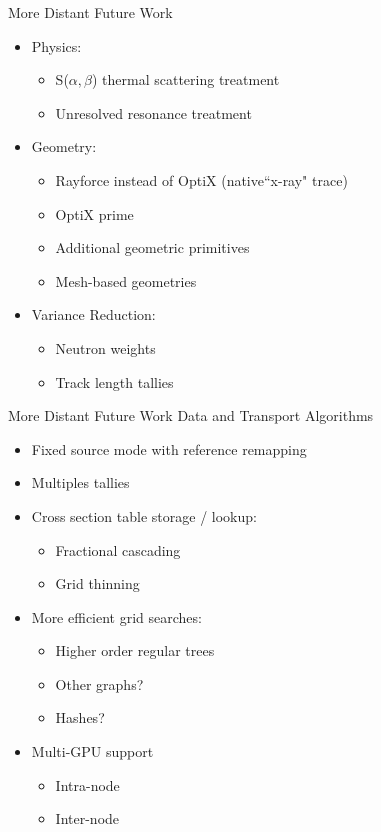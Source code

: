 \documentclass[xcolor=x11names, compress]{beamer}
\renewcommand{\(}{\begin{columns}}
\renewcommand{\)}{\end{columns}}
\newcommand{\<}[1]{\begin{column}{#1}}
\renewcommand{\>}{\end{column}}
\begin{document}
\begin{frame}{More Distant Future Work}
	\begin{itemize}
	\item Physics:
	    \begin{itemize}
	    \item S($\alpha, \beta$) thermal scattering treatment
	    \item Unresolved resonance treatment
	    \end{itemize}
	    \pause
	\vspace*{1 em}
	\item Geometry:
		\begin{itemize}
	    \item Rayforce instead of OptiX (native``x-ray" trace)
	    \item OptiX prime
	    \item Additional geometric primitives
		\item Mesh-based geometries
	    \end{itemize}
	    \pause
	\vspace*{1 em}
	\item Variance Reduction:
		\begin{itemize}
	    \item Neutron weights
	    \item Track length tallies
	    \end{itemize}
	\end{itemize}
\end{frame}


\begin{frame}{More Distant Future Work}
Data and Transport Algorithms
	\begin{itemize}
	\item Fixed source mode with reference remapping
	\pause
	\item Multiples tallies
	\pause
	\item Cross section table storage / lookup:
		\begin{itemize}
	    \item Fractional cascading
	    \item Grid thinning
	    \end{itemize}
	    \pause
	\item More efficient grid searches:
		\begin{itemize}
	    \item Higher order regular trees
		\item Other graphs? 
 		\item Hashes?
	    \end{itemize}
	    \pause
	\item Multi-GPU support
		\begin{itemize}
	    \item Intra-node
	    \item Inter-node
	    \end{itemize}
	\end{itemize}
\end{frame}
\end{document}
